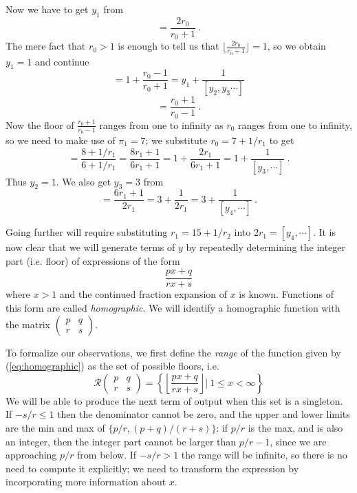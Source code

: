 \documentclass[11pt, oneside]{amsart}   	%
\newcommand{\pqrs}{\left(
\begin{smallmatrix} 
p & q\\ 
r & s 
\end{smallmatrix}
\right)}
\renewcommand{\:}{\negthickspace:\negthickspace}
\begin{document}
Now we have to get $y_1$ from 
\begin{equation*}
[y_1,y_2,\cdots] = \frac{2r_0}{r_0+1}\ .
\end{equation*}
The mere fact that $r_0>1$ is enough to tell us that $\lfloor \frac{2r_0}{r_0+1} \rfloor = 1$, so we obtain $y_1=1$ and continue
\begin{equation*}
[y_1,y_2,\cdots] = 1 + \frac{r_0-1}{r_0+1} = y_1 + \frac{1}{[y_2,y_3\cdots]}
\end{equation*}
\begin{equation*}
[y_2,\cdots] = \frac{r_0+1}{r_0-1} \ .
\end{equation*}
Now the floor of $\frac{r_0+1}{r_0-1}$ ranges from one to infinity as $r_0$ ranges from one to infinity,
so we need to make use of $\pi_1 = 7$; we substitute $r_0 = 7+1/r_1$ to get
\begin{equation*}
[y_2,\cdots] = \frac{8 + 1/r_1}{6 + 1/r_1} = \frac{8r_1 + 1}{6r_1 + 1} = 1 + \frac{2r_1}{6r_1 + 1}= 1 + \frac{1}{[y_3,\cdots]}\ .
\end{equation*}
Thus $y_2=1$.  We also get $y_3 = 3$ from
\begin{equation*}
[y_3,\cdots] =  \frac{6r_1 + 1}{2r_1} = 3 + \frac{1}{2r_1} = 3 + \frac{1}{[y_4,\cdots]}\ .
\end{equation*}

Going further will require substituting $r_1 = 15+1/r_2$ into $2r_1 = [y_4,\cdots]$.
It is now clear that we will generate terms of $y$ by repeatedly determining the integer part (i.e. floor) of expressions of the form
\begin{equation}\label{eq:homographic}
\frac{px+q}{rx+s}
\end{equation}
where $x>1$ and the continued fraction expansion of $x$ is known. Functions of this form are called \emph{homographic}.
We will identify a homographic function with the matrix
$\left(
\begin{smallmatrix} 
p & q\\ 
r & s 
\end{smallmatrix}
\right)$.

To formalize our observations, we first define the \emph{range} of the function given by (\ref{eq:homographic})
as the set of possible floors, i.e.
\[
\mathcal{R}\pqrs = \left\{ \left\lfloor \frac{px+q}{rx+s} \right\rfloor | \  1 \leq x < \infty \right\}
\]
We will be able to produce the next term of output when this set is a singleton. If $-s/r \leq 1$ then the denominator cannot be zero,
and the upper and lower limits are the min and max of $\{p/r, (p+q)/(r+s)\}$: if $p/r$ is the max, and is also an integer, then the
integer part cannot be larger than $p/r-1$, since we are approaching $p/r$ from below. If  $-s/r > 1$ the range will be infinite, so
there is no need to compute it explicitly; we need to transform the expression by incorporating more information about $x$.
\end{document}
